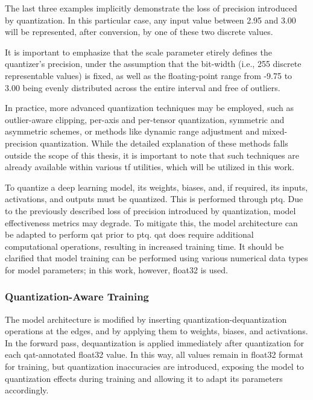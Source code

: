 {The last three examples implicitly demonstrate the loss of precision introduced by quantization.
In this particular case, any input value between 2.95 and 3.00 will be represented, after conversion, by one of these two discrete values.

It is important to emphasize that the scale parameter etirely defines the quantizer's precision,
under the assumption that the bit-width (i.e., 255 discrete representable values) is fixed,
as well as the floating-point range from -9.75 to 3.00 being evenly distributed across the entire interval and free of outliers.

In practice, more advanced quantization techniques may be employed, such as outlier-aware clipping, per-axis and per-tensor quantization,
symmetric and asymmetric schemes, or methods like dynamic range adjustment and mixed-precision quantization.
While the detailed explanation of these methods falls outside the scope of this thesis,
it is important to note that such techniques are already available within various \gls{tf} utilities, which will be utilized in this work.

To quantize a deep learning model, its weights, biases, and, if required, its inputs, activations, and outputs must be quantized. This is performed through \gls{ptq}.
Due to the previously described loss of precision introduced by quantization, model effectiveness metrics may degrade.
To mitigate this, the model architecture can be adapted to perform \gls{qat} prior to \gls{ptq}.
\gls{qat} does require additional computational operations, resulting in increased training time.
It should be clarified that model training can be performed using various numerical data types for model parameters; in this work, however, \gls{float32} is used.

\subsubsection{Quantization-Aware Training}

The model architecture is modified by inserting quantization-dequantization operations at the edges, and by applying them to weights, biases, and activations.
In the forward pass, dequantization is applied immediately after quantization for each \gls{qat}-annotated \gls{float32} value.
In this way, all values remain in \gls{float32} format for training,
but quantization inaccuracies are introduced, exposing the model to quantization effects during training and allowing it to adapt its parameters accordingly.

}
